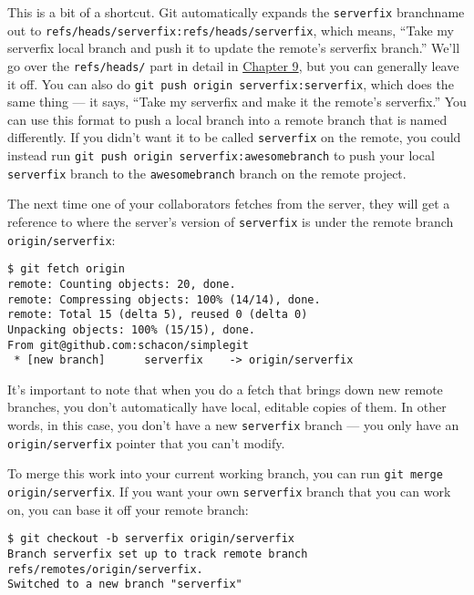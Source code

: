\documentclass[a4paper]{book}
\newcounter{tab}[chapter]
\newcommand{\prechap}{Chapter }
\newcommand{\postchap}{}
\newcommand{\chapref}[1]{\hyperref[chap:#1]{\prechap #1\postchap}}
\begin{document}
This is a bit of a shortcut. Git automatically expands the \texttt{serverfix} branchname out to \texttt{refs/heads/serverfix:refs/heads/serverfix}, which means, “Take my serverfix local branch and push it to update the remote's serverfix branch.” We'll go over the \texttt{refs/heads/} part in detail in \chapref{9}, but you can generally leave it off. You can also do \texttt{git push origin serverfix:serverfix}, which does the same thing --- it says, “Take my serverfix and make it the remote's serverfix.” You can use this format to push a local branch into a remote branch that is named differently. If you didn't want it to be called \texttt{serverfix} on the remote, you could instead run \texttt{git push origin serverfix:awesomebranch} to push your local \texttt{serverfix} branch to the \texttt{awesomebranch} branch on the remote project.

The next time one of your collaborators fetches from the server, they will get a reference to where the server's version of \texttt{serverfix} is under the remote branch \texttt{origin/serverfix}:

\begin{shaded}\begin{verbatim}
$ git fetch origin
remote: Counting objects: 20, done.
remote: Compressing objects: 100% (14/14), done.
remote: Total 15 (delta 5), reused 0 (delta 0)
Unpacking objects: 100% (15/15), done.
From git@github.com:schacon/simplegit
 * [new branch]      serverfix    -> origin/serverfix
\end{verbatim}\end{shaded}

It's important to note that when you do a fetch that brings down new remote branches, you don't automatically have local, editable copies of them. In other words, in this case, you don't have a new \texttt{serverfix} branch --- you only have an \texttt{origin/serverfix} pointer that you can't modify.

To merge this work into your current working branch, you can run \texttt{git merge origin/serverfix}. If you want your own \texttt{serverfix} branch that you can work on, you can base it off your remote branch:

\begin{shaded}\begin{verbatim}
$ git checkout -b serverfix origin/serverfix
Branch serverfix set up to track remote branch refs/remotes/origin/serverfix.
Switched to a new branch "serverfix"
\end{verbatim}\end{shaded}
\end{document}
